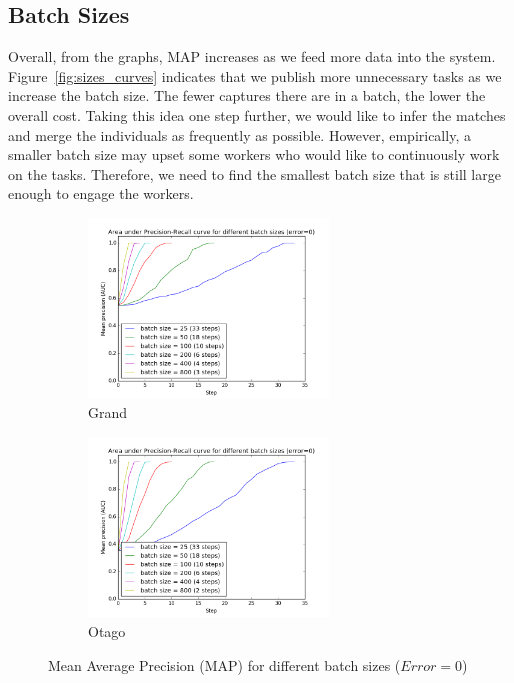 \subsection{Batch Sizes} %
\label{sub:batch_sizes_res}

Overall, from the graphs, MAP increases as we feed more data into the system.
Figure~\ref{fig:sizes_curves} indicates that we publish more unnecessary tasks
as we increase the batch size. The fewer captures there are in a batch, the
lower the overall cost. Taking this idea one step further, we would like to
infer the matches and merge the individuals as frequently as possible. However,
empirically, a smaller batch size may upset some workers who would like to
continuously work on the tasks. Therefore, we need to find the smallest batch
size that is still large enough to engage the workers.

\begin{figure}[htbp]
  \centering
  \begin{subfigure}[t]{\textwidth}
      \centering
      \includegraphics[width=0.7\textwidth]{sizes/graoc}
      \caption{Grand}
  \end{subfigure}%

    \begin{subfigure}[t]{\textwidth}
      \centering
      \includegraphics[width=0.7\textwidth]{sizes/otaoc}
      \caption{Otago}
  \end{subfigure}%
  \captionsetup{justification=centering}
  \caption{Mean Average Precision (MAP) for different batch sizes ($Error=0$)}
\end{figure}

